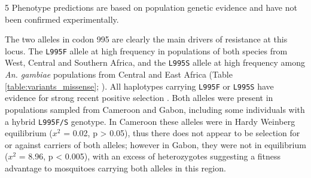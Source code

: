 \documentclass[a4paper,11pt,abstracton,hidelinks]{scrartcl}
\begin{document}
{\begin{landscape}
\begin{table}[h]
\begin{threeparttable}
\begin{tablenotes}
    \item[5] Phenotype predictions are based on population genetic evidence and have not been confirmed experimentally.
    
  \end{tablenotes}
  
  \end{threeparttable}
  
\end{table}
\end{landscape}
} %


%
The two alleles in codon 995 are clearly the main drivers of resistance at this locus.
The \texttt{L995F} allele at high frequency in populations of both species from West, Central and Southern Africa, and the \texttt{L995S} allele at high frequency among \textit{An. gambiae} populations from Central and East Africa (Table \ref{table:variants_missense}; \cite{Ag1000gConsortium2017}).
%
All haplotypes carrying \texttt{L995F} or \texttt{L995S} have evidence for strong recent positive selection \cite{Ag1000gConsortium2017}.
%
Both alleles were present in populations sampled from Cameroon and Gabon, including some individuals with a hybrid \texttt{L995F/S} genotype.
%
In Cameroon these alleles were in Hardy Weinberg equilibrium ($x^{2}$ = 0.02, p > 0.05), thus there does not appear to be selection for or against carriers of both alleles; however in Gabon, they were not in equilibrium ($x^{2}$ = 8.96, p < 0.005), with an excess of heterozygotes suggesting a fitness advantage to mosquitoes carrying both alleles in this region.
\end{document}
